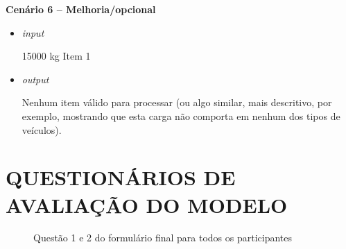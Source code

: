 \documentclass[english,brazilian]{UNISINOSartigo} %
\begin{document}
\textbf{Cenário 6 -- Melhoria/opcional}

\begin{itemize}[leftmargin=1cm, itemsep=0.1em, topsep=0.1em]
    \item \textit{input}
    \begin{itemize}[leftmargin=1.2cm, itemsep=0.1em, topsep=0.1em]
        15000 kg Item 1\\
    \end{itemize}
    \item \textit{output}
    \begin{itemize}[leftmargin=1.2cm, itemsep=0.1em, topsep=0.1em]
        Nenhum item válido para processar (ou algo similar, mais descritivo, por exemplo, mostrando que esta carga não comporta em nenhum dos tipos de veículos).
    \end{itemize}
\end{itemize}

\section{QUESTIONÁRIOS DE AVALIAÇÃO DO MODELO}

\renewcommand{\thefigure}{E.\arabic{figure}}
\setcounter{figure}{0}

\begin{figure}[ht]
    \caption{Questão 1 e 2 do formulário final para todos os participantes}
    \label{fig:questao1_2_geral}
    \centering
    \footnotesize
    \begin{minipage}{.9\textwidth}
        \centering
    \end{minipage}
\end{figure}
\FloatBarrier
\end{document}
